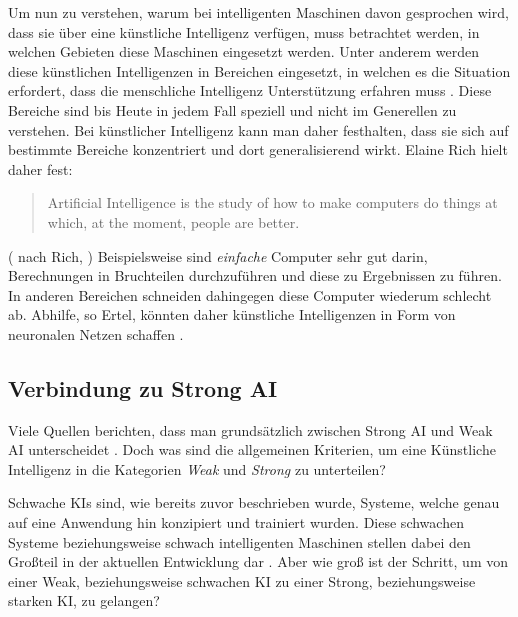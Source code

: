             Um nun zu verstehen, warum bei intelligenten Maschinen davon gesprochen wird, dass sie über eine
            künstliche Intelligenz verfügen, muss betrachtet werden, in welchen Gebieten diese Maschinen eingesetzt werden.
            Unter anderem werden diese künstlichen Intelligenzen in Bereichen eingesetzt, in welchen es die Situation
            erfordert, dass die menschliche Intelligenz Unterstützung erfahren muss \cite[s. 2]{ertel2016grundkurs}.
            Diese Bereiche sind bis Heute in jedem Fall speziell und nicht im Generellen zu verstehen. Bei künstlicher
            Intelligenz kann man daher festhalten, dass sie sich auf bestimmte Bereiche konzentriert und dort
            generalisierend wirkt. Elaine Rich hielt daher fest:
            \begin{quote}
                Artificial Intelligence is the study of how to make computers do things at which, at the moment, people are better.
            \end{quote}
            (\citeauthor{ertel2016grundkurs} nach Rich, \citeyear{ertel2016grundkurs})
            Beispielsweise sind \textit{einfache} Computer sehr gut darin, Berechnungen in Bruchteilen durchzuführen und diese zu
            Ergebnissen zu führen.\cite[s. 3]{ertel2016grundkurs}
            In anderen Bereichen schneiden dahingegen diese Computer wiederum schlecht ab. Abhilfe, so Ertel,
            könnten daher künstliche Intelligenzen in Form von neuronalen Netzen schaffen \citeyearpar{ertel2016grundkurs}.

        \subsection{Verbindung zu Strong AI}
            Viele Quellen berichten, dass man grundsätzlich zwischen Strong AI und Weak AI unterscheidet \cite{huang_beef}.
            Doch was sind die allgemeinen Kriterien, um eine Künstliche Intelligenz in die Kategorien \textit{Weak}
            und \textit{Strong} zu unterteilen?

            Schwache KIs sind, wie bereits zuvor beschrieben wurde, Systeme, welche genau auf eine Anwendung hin
            konzipiert und trainiert wurden. Diese schwachen Systeme beziehungsweise schwach intelligenten Maschinen
            stellen dabei den Großteil in der aktuellen Entwicklung dar \cite{brendel_2019}. Aber wie groß ist der
            Schritt, um von einer Weak, beziehungsweise schwachen KI zu einer Strong, beziehungsweise starken KI, zu
            gelangen?

